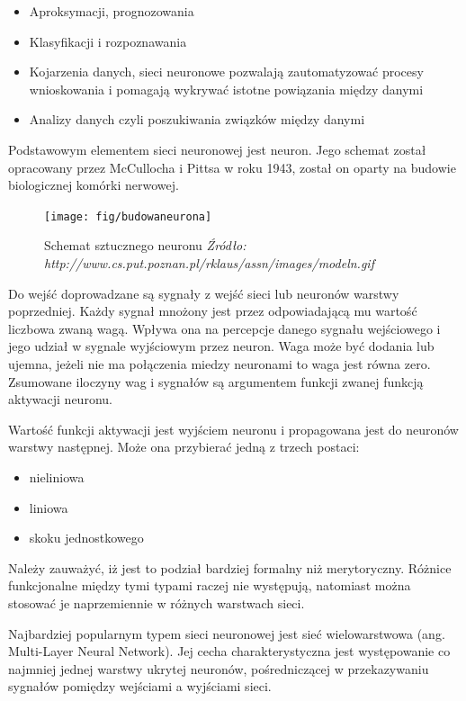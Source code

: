 \documentclass[brudnopis]{xmgr}
\begin{document}
\begin{itemize}
\item
Aproksymacji, prognozowania
\item
Klasyfikacji i rozpoznawania
\item
Kojarzenia danych, sieci neuronowe pozwalają zautomatyzować procesy wnioskowania i pomagają wykrywać istotne powiązania między danymi
\item
Analizy danych czyli poszukiwania związków między danymi
\end{itemize}

Podstawowym elementem sieci neuronowej jest neuron. Jego schemat został opracowany przez McCullocha i Pittsa w roku 1943, został on oparty na budowie biologicznej komórki nerwowej.

\begin{figure}[!tbh]
\centering
\texttt{[image: fig/budowaneurona]}
\caption{Schemat sztucznego neuronu \emph{Źródło: http://www.cs.put.poznan.pl/rklaus/assn/images/modeln.gif}}
\end{figure}

Do wejść doprowadzane są sygnały z wejść sieci lub neuronów warstwy poprzedniej. Każdy sygnał mnożony jest przez odpowiadającą mu wartość liczbowa zwaną wagą. Wpływa ona na percepcje danego sygnału wejściowego i jego udział w sygnale wyjściowym przez neuron. Waga może być dodania lub ujemna, jeżeli nie ma połączenia miedzy neuronami to waga jest równa zero. Zsumowane iloczyny wag i sygnałów są argumentem funkcji zwanej funkcją aktywacji neuronu.
\newpage

Wartość funkcji aktywacji jest wyjściem neuronu i propagowana jest do neuronów warstwy następnej. Może ona przybierać jedną z trzech postaci:
\begin{itemize}
\item
nieliniowa
\item
liniowa
\item
skoku jednostkowego
\end{itemize}

Należy zauważyć, iż jest to podział bardziej formalny niż merytoryczny. Różnice funkcjonalne między tymi typami raczej nie występują, natomiast można stosować je naprzemiennie w różnych warstwach sieci.

Najbardziej popularnym typem sieci neuronowej jest sieć wielowarstwowa (ang. Multi-Layer Neural Network). Jej cecha charakterystyczna jest występowanie co najmniej jednej warstwy ukrytej neuronów, pośredniczącej w przekazywaniu sygnałów pomiędzy wejściami a wyjściami sieci.
\end{document}
